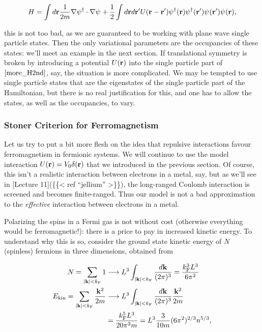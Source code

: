 \[
H = \int d\br \frac{1}{2m}\nabla\pdop\cdot\nabla\pop + \frac{1}{2}\int d\br d\br' U(\br-\br')\pdop(\br)\pdop(\br')\pop(\br')\pop(\br),
\label{more_H2nd}
\]

this is not too bad, as we are guaranteed to be working with plane wave
single particle states. Then the only variational parameters are the
occupancies of these states: we'll meet an example in the next section.
If translational symmetry is broken by introducing a potential
\(U(\mathbf{r})\) into the single particle part of \(\eqref{more_H2nd}\), say,
the situation is more complicated. We may be tempted to use single
particle states that are the eigenstates of the single particle part of
the Hamiltonian, but there is no real justification for this, and one
has to allow the states, as well as the occupancies, to vary.

\hypertarget{stoner-criterion-for-ferromagnetism}{%
\subsubsection{Stoner Criterion for
Ferromagnetism}\label{stoner-criterion-for-ferromagnetism}}

Let us try to put a bit more flesh on the idea that repulsive
interactions favour ferromagnetism in fermionic systems. We will
continue to use the model interaction \(U(\mathbf{r})=V_0\delta(\mathbf{r})\) that we
introduced in the previous section. Of course, this isn't a realistic
interaction between electrons in a metal, say, but as we'll see in
{[}Lecture 11{]}(\{\{\textless{} ref ``jellium'' \textgreater\}\}), the
long-ranged Coulomb interaction is screened and becomes finite-ranged.
Thus our model is not a bad approximation to the \emph{effective}
interaction between electrons in a metal.

Polarizing the spins in a Fermi gas is not without cost (otherwise
everything would be ferromagnetic!): there is a price to pay in
increased kinetic energy. To understand why this is so, consider the
ground state kinetic energy of \(N\) (spinless) fermions in three
dimensions, obtained from

\[
\begin{align}
N = \sum_{|\mathbf{k}|<k_\text{F}} 1 &\longrightarrow L^3 \int_{|\mathbf{k}|<k_\text{F}} \frac{d\mathbf{k}}{(2\pi)^3} = \frac{k_\text{F}^3 L^3}{6\pi^2} \nonumber\\
E_\text{kin} = \sum_{|\mathbf{k}|<k_\text{F}} \frac{\mathbf{k}^2}{2m} &\longrightarrow L^3 \int_{|\mathbf{k}|<k_\text{F}} \frac{d\mathbf{k}}{(2\pi)^3} \frac{\mathbf{k}^2}{2m}\\
 &= \frac{k_\text{F}^5 L^3}{20\pi^2 m} = L^3 \frac{3}{10m}(6\pi^2)^{2/3} n^{5/3},\nonumber
\end{align}
\]

